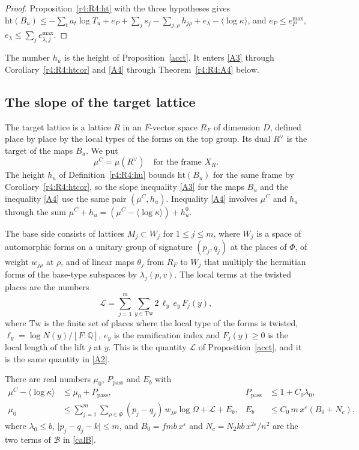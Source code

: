 \begin{proof}
Proposition~\ref{r4:R4:ht} with the three hypotheses gives $\mathrm{ht}(B_u)\le-\sum_ta_t\log T_u+e_P+\sum_js_j-\sum_{j,\rho}h_{j\rho}+e_\lambda-\langle\log\kappa\rangle$, and $e_P\le e_P^{\max}$, $e_\lambda\le\sum_je^{\max}_{\lambda,j}$.
\end{proof}

The number $h_u$ is the height of Proposition~\ref{acct}. It enters \eqref{A3} through Corollary~\ref{r4:R4:htcor} and \eqref{A4} through Theorem~\ref{r4:R4:A4} below.

\subsection{The slope of the target lattice}\label{r4:sec:R4target}

The target lattice is a lattice $R$ in an $F$-vector space $R_F$ of dimension $D$, defined place by place by the local types of the forms on the top group. Its dual $R^\vee$ is the target of the maps $B_u$. We put
\[
\mu^C=\mu(R^\vee)\quad\text{for the frame }X_R .
\]
The height $h_u$ of Definition~\ref{r4:R4:hu} bounds $\mathrm{ht}(B_u)$ for the same frame by Corollary~\ref{r4:R4:htcor}, so the slope inequality \eqref{A3} for the maps $B_u$ and the inequality \eqref{A4} use the same pair $(\mu^C,h_u)$. Inequality \eqref{A4} involves $\mu^C$ and $h_u$ through the sum $\mu^C+h_u=(\mu^C-\langle\log\kappa\rangle)+h^0_u$.

The base side consists of lattices $M_j\subset W_j$ for $1\le j\le m$, where $W_j$ is a space of automorphic forms on a unitary group of signature $(p_j,q_j)$ at the places of $\Phi$, of weight $w_{j\rho}$ at $\rho$, and of linear maps $\theta_j$ from $R_F$ to $W_j$ that multiply the hermitian forms of the base-type subspaces by $\lambda_j(p,v)$. The local terms at the twisted places are the numbers
\begin{equation}\label{r4:R4:calL}
\mathcal L=\sum_{j=1}^m\sum_{y\in\mathrm{Tw}}2\,\ell_y\,e_y\,F_j(y),
\end{equation}
where $\mathrm{Tw}$ is the finite set of places where the local type of the forms is twisted, $\ell_y=\log N(y)/[F:\mathbb Q]$, $e_y$ is the ramification index and $F_j(y)\ge0$ is the local length of the lift $j$ at $y$. This is the quantity $\mathcal L$ of Proposition~\ref{acct}, and it is the same quantity in \eqref{A2}.

\begin{hypothesis}\label{r4:R4:HT}
There are real numbers $\mu_0$, $P_{\mathrm{pass}}$ and $E_b$ with
\begin{align*}
\mu^C-\langle\log\kappa\rangle&\le\mu_0+P_{\mathrm{pass}},& P_{\mathrm{pass}}&\le1+C_0\lambda_0,\\
\mu_0&\le\sum_{j=1}^m\sum_{\rho\in\Phi}(p_j-q_j)\,w_{j\rho}\log\Omega+\mathcal L+E_b,& E_b&\le C_0\,m\,x^{\varepsilon}(B_0+N_c),
\end{align*}
where $\lambda_0\le b$, $\lvert p_j-q_j-k\rvert\le m$, and $B_0=fmb\,x^\varepsilon$ and $N_c=N_2kb\,x^{2\varepsilon}/n^2$ are the two terms of $\mathcal B$ in \eqref{calB}.
\end{hypothesis}

